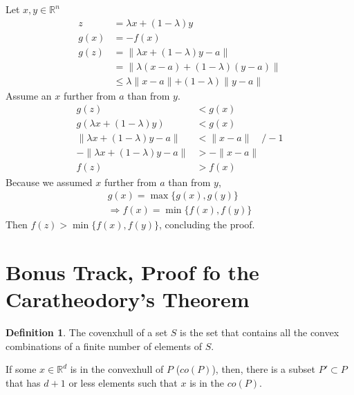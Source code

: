 \documentclass[answers]{exam}
\theoremstyle{definition}
\newtheorem{definition}{Definition}[section]
\begin{document}
\begin{questions}
    \begin{solution}
            Let $x,y\in\mathds{R}^n$
            \begin{align*}
                z&=\lambda x+(1-\lambda)y\\
                g(x)&=-f(x)\\
                g(z)&=\parallel \lambda x+(1-\lambda)y-a\parallel\\
                &=\parallel\lambda(x-a)+(1-\lambda)(y-a)\parallel\\
                &\leq\lambda \parallel x-a\parallel+(1-\lambda)\parallel y-a\parallel
            \end{align*}
            Assume an $x$ further from $a$ than from $y$.
            \begin{align*}
                g(z)&<g(x)\\
                g(\lambda x+(1-\lambda)y)&<g(x)\\
                \parallel \lambda x+(1-\lambda)y-a\parallel &< \parallel x-a\parallel \quad /-1\\
                -\parallel \lambda x+(1-\lambda)y-a\parallel &> -\parallel x-a\parallel\\
                f(z)&>f(x)
            \end{align*}
            Because we assumed $x$ further from $a$ than from $y$,
            \begin{align*}
                g(x)=\max\{g(x),g(y)\}\\
                \Rightarrow f(x)=\min\{f(x),f(y)\}
            \end{align*}
            Then $f(z)>\min\{f(x),f(y)\}$, concluding the proof.
        \end{solution}

\section{Bonus Track, Proof fo the Caratheodory's Theorem}

\begin{definition}
    The covenxhull of a set $S$ is the set that contains all the convex combinations of a finite number of elements of $S$.
\end{definition}

If some $x\in\mathds{R}^d$ is in the convexhull of $P$ ($co(P)$), then, there is a subset $P'\subset P$ that has $d+1$ or less elements such that $x$ is in the $co(P)$.

\begin{solution}


\end{solution}
\end{questions}
\end{document}
